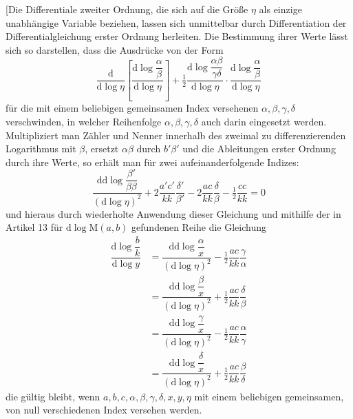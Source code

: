 [Die Differentiale zweiter Ordnung, die sich auf die Größe $\eta$ als einzige unabhängige Variable beziehen, lassen sich unmittelbar durch Differentiation der Differentialgleichung erster Ordnung herleiten. Die Bestimmung ihrer Werte lässt sich so darstellen, dass die Ausdrücke von der Form
\[
\dfrac{\mathrm{d}}{\mathrm{d}\log\eta}
\left[\dfrac{\mathrm{d}\log\dfrac{\alpha}{\beta}}{\mathrm{d}\log\eta}\right]
+\tfrac12\dfrac{\mathrm{d}\log\dfrac{\alpha\beta}{\gamma\delta}}{\mathrm{d}\log\eta}
\cdot\dfrac{\mathrm{d}\log\dfrac{\alpha}{\beta}}{\mathrm{d}\log\eta}
\]
für die mit einem beliebigen gemeinsamen Index versehenen $\alpha,\allowbreak \beta,\allowbreak \gamma,\allowbreak \delta$ verschwinden, in welcher Reihenfolge $\alpha,\allowbreak \beta,\allowbreak \gamma,\allowbreak \delta$ auch darin eingesetzt werden. Multipliziert man Zähler und Nenner innerhalb des zweimal zu differenzierenden Logarithmus mit $\beta$, ersetzt $\alpha\beta$ durch $b'\beta'$ und die Ableitungen erster Ordnung durch ihre Werte, so erhält man für zwei aufeinanderfolgende Indizes:
\[
\dfrac{\mathrm{dd}\log\dfrac{\beta'}{\beta\beta}}{(\mathrm{d}\log\eta)^2}
+2\dfrac{a'c'}{kk}\dfrac{\delta'}{\beta'}
-2\dfrac{ac}{kk}\dfrac{\delta}{\beta}-\tfrac12\dfrac{cc}{kk}=0
\]
und hieraus durch wiederholte Anwendung dieser Gleichung und mithilfe der in Artikel 13 für $\mathrm{d}\log\mathrm{M}(a,\allowbreak b)$ gefundenen Reihe die Gleichung
\[
\begin{aligned}\dfrac{\mathrm{d}\log\dfrac{b}{k}}{\mathrm{d}\log y}
&=\dfrac{\mathrm{dd}\log\dfrac{\alpha}{x}}{(\mathrm{d}\log\eta)^2}-\tfrac12\dfrac{ac}{kk}\dfrac{\gamma}{\alpha}
\\[7pt]&=\dfrac{\mathrm{dd}\log\dfrac{\beta}{x}}{(\mathrm{d}\log\eta)^2}+\tfrac12\dfrac{ac}{kk}\dfrac{\delta}{\beta}
\\[7pt]&=\dfrac{\mathrm{dd}\log\dfrac{\gamma}{x}}{(\mathrm{d}\log\eta)^2}-\tfrac12\dfrac{ac}{kk}\dfrac{\alpha}{\gamma}
\\[7pt]&=\dfrac{\mathrm{dd}\log\dfrac{\delta}{x}}{(\mathrm{d}\log\eta)^2}+\tfrac12\dfrac{ac}{kk}\dfrac{\beta}{\delta}\end{aligned}
\]
die gültig bleibt, wenn $a,\allowbreak b,\allowbreak c,\allowbreak \alpha,\allowbreak \beta,\allowbreak \gamma,\allowbreak \delta,\allowbreak x,\allowbreak y,\allowbreak \eta$ mit einem beliebigen gemeinsamen, von null verschiedenen Index versehen werden.

